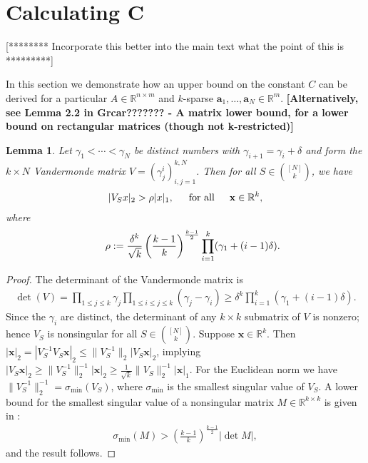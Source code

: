 \documentclass[journal, onecolumn]{IEEEtran}
\newtheorem{lemma}{Lemma}
\begin{document}

\section{Calculating C}

[********  Incorporate this better into the main text what the point of this is *********]

In this section we demonstrate how an upper bound on the constant $C$ can be derived for a particular $A \in \mathbb{R}^{n \times m}$ and $k$-sparse $\mathbf{a}_1, \ldots, \mathbf{a}_N \in \mathbb{R}^m$. \textbf{[Alternatively, see Lemma 2.2 in Grcar??????? - A matrix lower bound, for a lower bound on rectangular matrices (though not k-restricted)]}


\begin{lemma}\label{MatrixLowerBoundLemma}
Let $\gamma_1 < \cdots < \gamma_N$ be distinct numbers with $\gamma_{i+1} = \gamma_i + \delta$ and form the $k \times N$ Vandermonde matrix $V = (\gamma^i_j)^{k,N}_{i,j=1}$. Then for all $S \in {[N] \choose k}$, we have
\begin{align}
	|V_S x|_2 > \rho |x|_1, \indent \text{for all} \indent \mathbf{x} \in \mathbb{R}^k,
\end{align}
where \[\indent \rho := \frac{\delta^k}{\sqrt{k}} \left( \frac{k-1}{k} \right)^\frac{k-1}{2} \prod_{i = 1}^k (\gamma_1 + (i-1)\delta).\]
\end{lemma}


\begin{proof} 
The determinant of the Vandermonde matrix is
\begin{align}
	\det(V) = \prod_{1 \leq j \leq k} \gamma_j \prod_{1 \leq i \leq j \leq k} (\gamma_j - \gamma_i) \geq \delta^k \prod_{i = 1}^k (\gamma_1 + (i-1)\delta).
\end{align}	
Since the $\gamma_i$ are distinct, the determinant of any $k \times k$ submatrix of $V$ is nonzero; hence $V_S$ is nonsingular for all $S \in {[N] \choose k}$. Suppose $\mathbf{x} \in \mathbb{R}^k$. Then $|\mathbf{x}|_2 = |V_S^{-1} V_S \mathbf{x}|_2 \leq \|V_S^{-1}\|_2 |V_S \mathbf{x}|_2$, implying $|V_S \mathbf{x}|_2 \geq \|V_S^{-1}\|_2^{-1}|\mathbf{x}|_2 \geq \frac{1}{\sqrt{k}} \|V_S\|_2^{-1}|\mathbf{x}|_1$. For the Euclidean norm we have $\|V_S^{-1}\|_2^{-1} = \sigma_{\min}(V_S)$, where $\sigma_{\min}$ is the smallest singular value of $V_S$. A lower bound for the smallest singular value of a nonsingular matrix $M \in \mathbb{R}^{k \times k}$ is given in \cite{hong1992lower}:
\begin{align}
	\sigma_{\min}(M) > \left( \frac{k-1}{k} \right)^\frac{k-1}{2} |\det M|,
\end{align}
%
and the result follows. 
\end{proof}
\end{document}

